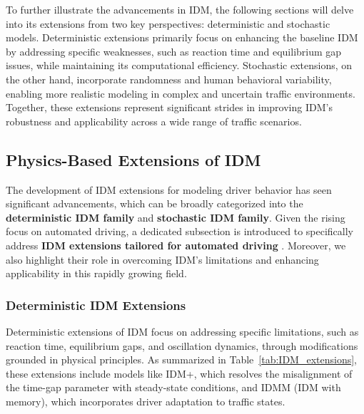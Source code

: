 \documentclass[a4paper,fleqn]{cas-sc}
\begin{document}
To further illustrate the advancements in IDM, the following sections will delve into its extensions from two key perspectives: deterministic and stochastic models. Deterministic extensions primarily focus on enhancing the baseline IDM by addressing specific weaknesses, such as reaction time and equilibrium gap issues, while maintaining its computational efficiency. Stochastic extensions, on the other hand, incorporate randomness and human behavioral variability, enabling more realistic modeling in complex and uncertain traffic environments. Together, these extensions represent significant strides in improving IDM's robustness and applicability across a wide range of traffic scenarios.




\subsection{Physics-Based Extensions of IDM}

The development of IDM extensions for modeling driver behavior has seen significant advancements, which can be broadly categorized into the \textbf{deterministic IDM family} and \textbf{stochastic IDM family}. Given the rising focus on automated driving, a dedicated subsection is introduced to specifically address \textbf{IDM extensions tailored for automated driving} . Moreover, we also highlight their role in overcoming IDM's limitations and enhancing applicability in this rapidly growing field.

\subsubsection{Deterministic IDM Extensions}

Deterministic extensions of IDM focus on addressing specific limitations, such as reaction time, equilibrium gaps, and oscillation dynamics, through modifications grounded in physical principles. As summarized in Table~\ref{tab:IDM_extensions}, these extensions include models like IDM+, which resolves the misalignment of the time-gap parameter with steady-state conditions, and IDMM (IDM with memory), which incorporates driver adaptation to traffic states.
\end{document}
